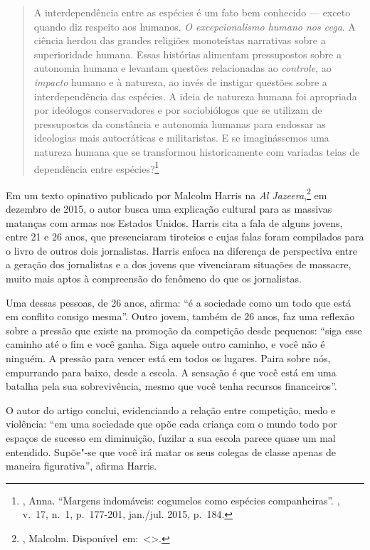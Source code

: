 \begin{quote}
A interdependência entre as espécies é um fato bem conhecido --- exceto
quando diz respeito aos humanos. \emph{O excepcionalismo humano nos
cega}. A ciência herdou das grandes religiões monoteístas narrativas
sobre a superioridade humana. Essas histórias alimentam pressupostos
sobre a autonomia humana e levantam questões relacionadas ao
\emph{controle}, ao \emph{impacto} humano e à natureza, ao invés de
instigar questões sobre a interdependência das espécies. A ideia de
natureza humana foi apropriada por ideólogos conservadores e por
sociobiólogos que se utilizam de pressupostos da constância e autonomia
humanas para endossar as ideologias mais autocráticas e militaristas. E
se imaginássemos uma natureza humana que se transformou historicamente
com variadas teias de dependência entre espécies?\footnote{,
  Anna. ``Margens indomáveis: cogumelos como espécies companheiras''. {}, v.~17, n.~1, p.~177-201, jan./jul. 2015, p.~184.} %
\end{quote}

\asterisc

Em um texto opinativo publicado por Malcolm Harris na \emph{Al Jazeera},\footnote{, Malcolm. \mbox{Disponível em: \textless{}{}\textgreater{}.}}
em dezembro de 2015, o autor busca uma explicação cultural para as
massivas matanças com armas nos Estados Unidos. Harris cita a fala de
alguns jovens, entre 21 e 26 anos, que presenciaram tiroteios e cujas
falas foram compilados para o livro de outros dois jornalistas. Harris
enfoca na diferença de perspectiva entre a geração dos jornalistas e a
dos jovens que vivenciaram situações de massacre, muito mais aptos à
compreensão do fenômeno do que os jornalistas.

Uma dessas pessoas, de 26 anos, afirma: ``é a sociedade como um
todo que está em conflito consigo mesma''. Outro jovem, também de 26
anos, faz uma reflexão sobre a pressão que existe na promoção da
competição desde pequenos: ``siga esse caminho até o fim e você ganha.
Siga aquele outro caminho, e você não é ninguém. A pressão para vencer
está em todos os lugares. Paira sobre nós, empurrando para baixo, desde
a escola. A sensação é que você está em uma batalha pela sua
sobrevivência, mesmo que você tenha recursos
financeiros''.

O autor do artigo conclui, evidenciando a relação entre
competição, medo e violência: ``em uma sociedade que opõe cada criança
com o mundo todo por espaços de sucesso em diminuição, fuzilar a sua
escola parece quase um mal entendido. Supõe"-se que você irá matar os
seus colegas de classe apenas de maneira figurativa'', afirma
Harris.

